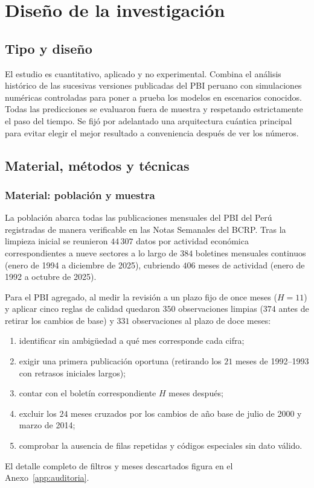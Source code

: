 \section{Diseño de la investigación}

\subsection{Tipo y diseño}

El estudio es cuantitativo, aplicado y no experimental. Combina el análisis histórico de las sucesivas versiones publicadas del PBI peruano con simulaciones numéricas controladas para poner a prueba los modelos en escenarios conocidos. Todas las predicciones se evaluaron fuera de muestra y respetando estrictamente el paso del tiempo. Se fijó por adelantado una arquitectura cuántica principal para evitar elegir el mejor resultado a conveniencia después de ver los números.

\subsection{Material, métodos y técnicas}

\subsubsection{Material: población y muestra}

La población abarca todas las publicaciones mensuales del PBI del Perú registradas de manera verificable en las Notas Semanales del BCRP. Tras la limpieza inicial se reunieron \(44\,307\) datos por actividad económica correspondientes a nueve sectores a lo largo de \(384\) boletines mensuales continuos (enero de 1994 a diciembre de 2025), cubriendo \(406\) meses de actividad (enero de 1992 a octubre de 2025).

Para el PBI agregado, al medir la revisión a un plazo fijo de once meses (\(H=11\)) y aplicar cinco reglas de calidad quedaron \(350\) observaciones limpias (\(374\) antes de retirar los cambios de base) y \(331\) observaciones al plazo de doce meses:
\begin{enumerate}
	\item identificar sin ambigüedad a qué mes corresponde cada cifra;
	\item exigir una primera publicación oportuna (retirando los \(21\) meses de 1992--1993 con retrasos iniciales largos);
	\item contar con el boletín correspondiente \(H\) meses después;
	\item excluir los \(24\) meses cruzados por los cambios de año base de julio de 2000 y marzo de 2014;
	\item comprobar la ausencia de filas repetidas y códigos especiales sin dato válido.
\end{enumerate}
El detalle completo de filtros y meses descartados figura en el Anexo~\ref{app:auditoria}.

